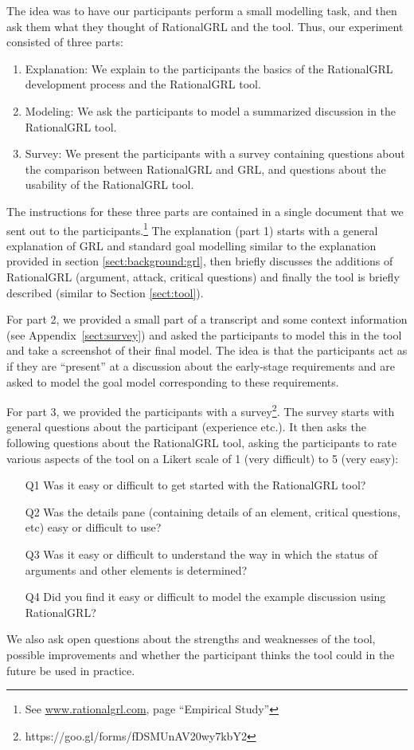 The idea was to have our participants perform a small modelling task, and then ask them what they thought of RationalGRL and the tool. Thus, our experiment consisted of three parts:

\begin{enumerate}
\item Explanation: We explain to the participants the basics of the RationalGRL development process and the RationalGRL tool.
\item Modeling: We ask the participants to model a summarized discussion in the RationalGRL tool.
\item Survey: We present the participants with a survey containing questions about the comparison between RationalGRL and GRL, and questions about the usability of the RationalGRL tool.
\end{enumerate}

The instructions for these three parts are contained in a single document that we sent out to the participants.\footnote{See \url{www.rationalgrl.com}, page ``Empirical Study''} The explanation (part 1) starts with a general explanation of GRL and standard goal modelling similar to the explanation provided in section \ref{sect:background:grl}, then briefly discusses the additions of RationalGRL (argument, attack, critical questions) and finally the tool is briefly described (similar to Section \ref{sect:tool}). 

For part 2, we provided a small part of a transcript and some context information (see Appendix~\ref{sect:survey}) and asked the participants to model this in the tool and take a screenshot of their final model. The idea is that the participants act as if they are ``present'' at a discussion about the early-stage requirements and are asked to model the goal model corresponding to these requirements. 

For part 3, we provided the participants with a survey\footnote{https://goo.gl/forms/fDSMUnAV20wy7kbY2}. The survey starts with general questions about the participant (experience etc.). It then asks the following questions about the RationalGRL tool, asking the participants to rate various aspects of the tool on a Likert scale of 1 (very difficult) to 5 (very easy):
\begin{itemize}
\item[Q1] Was it easy or difficult to get started with the RationalGRL tool?
\item[Q2] Was the details pane (containing details of an element, critical questions, etc) easy or difficult to use?
\item[Q3] Was it easy or difficult to understand the way in which the status of arguments and other elements is determined?
\item[Q4] Did you find it easy or difficult to model the example discussion using RationalGRL?
\end{itemize}
We also ask open questions about the strengths and weaknesses of the tool, possible improvements and whether the participant thinks the tool could in the future be used in practice.

